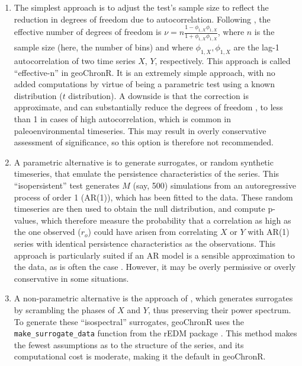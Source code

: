 \documentclass[gchron, manuscript]{copernicus}
\begin{document}
\begin{enumerate}
\def\labelenumi{\arabic{enumi}.}
\item
  The simplest approach is to adjust the test's sample size to reflect the reduction in degrees of freedom due to autocorrelation. Following \citet{dawdy1964statistical}, the effective number of degrees of freedom is \(\nu = n \frac{1-\phi_{1,X}\phi_{1,X}}{1+\phi_{1,X}\phi_{1,X}}\), where \(n\) is the sample size (here, the number of bins) and where \(\phi_{1,X}, \phi_{1,X}\) are the lag-1 autocorrelation of two
  time series \(X\), \(Y\), respectively. This approach is called ``effective-n'' in geoChronR. It is an extremely simple approach, with no added computations by virtue of being a parametric test using a known distribution (\(t\) distribution).
  A downside is that the correction is approximate, and can substantially reduce the degrees of freedom \citep{Hu_epsl17}, to less than 1 in cases of high autocorrelation, which is common in paleoenvironmental timeseries.
  This may result in overly conservative assessment of significance, so this option is therefore not recommended.
\item
  A parametric alternative is to generate surrogates, or random synthetic timeseries, that emulate the persistence characteristics of the series.
  This ``isopersistent'' test generates \(M\) (say, 500) simulations from an autoregressive process of order 1 (AR(1)), which has been fitted to the data.
  These random timeseries are then used to obtain the null distribution, and compute p-values, which therefore measure the probability that a correlation as high as the one observed (\(r_o\)) could have arisen from correlating \(X\) or \(Y\) with AR(1) series with identical persistence characteristics as the observations.
  This approach is particularly suited if an AR model is a sensible approximation to the data, as is often the case \citep{Ghil02}.
  However, it may be overly permissive or overly conservative in some situations.
\item
  A non-parametric alternative is the approach of \citet{Ebisuzaki_JClim97}, which generates surrogates by scrambling the phases of \(X\) and \(Y\), thus preserving their power spectrum.
  To generate these ``isospectral'' surrogates, geoChronR uses the \texttt{make\_surrogate\_data} function from the rEDM package \citep{rEDM}.
  This method makes the fewest assumptions as to the structure of the series, and its computational cost is moderate, making it the default in geoChronR.
\end{enumerate}
\end{document}
